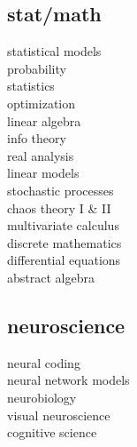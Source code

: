 \begin{minipage}[t]{0.33\textwidth}
\subsection{stat/math}
statistical models \\
probability \\
statistics \\
optimization \\
linear algebra \\
info theory \\
real analysis \\
linear models \\
stochastic processes \\
chaos theory I \& II \\
multivariate calculus \\
discrete mathematics \\
differential equations \\
abstract algebra

\sectionspace %


\subsection{neuroscience}
neural coding \\
neural network models \\
neurobiology \\
visual neuroscience \\
cognitive science \\


\end{minipage} %
\hfill
%
%

